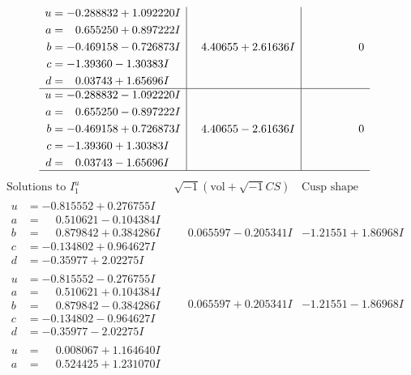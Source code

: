 \documentclass[1p]{elsarticle_modified}
\theoremstyle{definition}
\newcommand{\I}{\sqrt{-1}}
\begin{document}
$$\begin{array}{c|c|c}
\begin{aligned}
u &= -0.288832 + 1.092220 I \\
a &= \phantom{-}0.655250 + 0.897222 I \\
b &= -0.469158 - 0.726873 I \\
c &= -1.39360 - 1.30383 I \\
d &= \phantom{-}0.03743 + 1.65696 I\end{aligned}
 & \phantom{-}4.40655 + 2.61636 I & \phantom{-0.000000 } 0 \\ \hline\begin{aligned}
u &= -0.288832 - 1.092220 I \\
a &= \phantom{-}0.655250 - 0.897222 I \\
b &= -0.469158 + 0.726873 I \\
c &= -1.39360 + 1.30383 I \\
d &= \phantom{-}0.03743 - 1.65696 I\end{aligned}
 & \phantom{-}4.40655 - 2.61636 I & \phantom{-0.000000 } 0\\
 \hline 
 \end{array}$$\newpage$$\begin{array}{c|c|c}  
\text{Solutions to }I^u_{1}& \I (\text{vol} + \sqrt{-1}CS) & \text{Cusp shape}\\
 \hline 
\begin{aligned}
u &= -0.815552 + 0.276755 I \\
a &= \phantom{-}0.510621 - 0.104384 I \\
b &= \phantom{-}0.879842 + 0.384286 I \\
c &= -0.134802 + 0.964627 I \\
d &= -0.35977 + 2.02275 I\end{aligned}
 & \phantom{-}0.065597 - 0.205341 I & -1.21551 + 1.86968 I \\ \hline\begin{aligned}
u &= -0.815552 - 0.276755 I \\
a &= \phantom{-}0.510621 + 0.104384 I \\
b &= \phantom{-}0.879842 - 0.384286 I \\
c &= -0.134802 - 0.964627 I \\
d &= -0.35977 - 2.02275 I\end{aligned}
 & \phantom{-}0.065597 + 0.205341 I & -1.21551 - 1.86968 I \\ \hline\begin{aligned}
u &= \phantom{-}0.008067 + 1.164640 I \\
a &= \phantom{-}0.524425 + 1.231070 I \\

\end{aligned}
\end{array}$$
\end{document}
